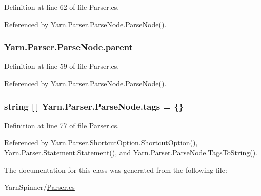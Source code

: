 Definition at line 62 of file Parser.\-cs.



Referenced by Yarn.\-Parser.\-Parse\-Node.\-Parse\-Node().

\hypertarget{a00150_af313a82103fcc2ff5a177dbb06b92f7b}{
\subsubsection[{parent}]{ Yarn.\-Parser.\-Parse\-Node.\-parent\hspace{0.3cm}{\ttfamily [package]}}}\label{a00150_af313a82103fcc2ff5a177dbb06b92f7b}


Definition at line 59 of file Parser.\-cs.



Referenced by Yarn.\-Parser.\-Parse\-Node.\-Parse\-Node().

\hypertarget{a00150_a58b3a15788fd2d4127d73619dc6d04ae}{
\subsubsection[{tags}]{\setlength{\rightskip}{0pt plus 5cm}string \mbox{[}$\,$\mbox{]} Yarn.\-Parser.\-Parse\-Node.\-tags = \{\}\hspace{0.3cm}{\ttfamily [package]}}}\label{a00150_a58b3a15788fd2d4127d73619dc6d04ae}


Definition at line 77 of file Parser.\-cs.



Referenced by Yarn.\-Parser.\-Shortcut\-Option.\-Shortcut\-Option(), Yarn.\-Parser.\-Statement.\-Statement(), and Yarn.\-Parser.\-Parse\-Node.\-Tags\-To\-String().



The documentation for this class was generated from the following file\-:\begin{DoxyCompactItemize}
\item 
Yarn\-Spinner/\hyperlink{a00316}{Parser.\-cs}\end{DoxyCompactItemize}
